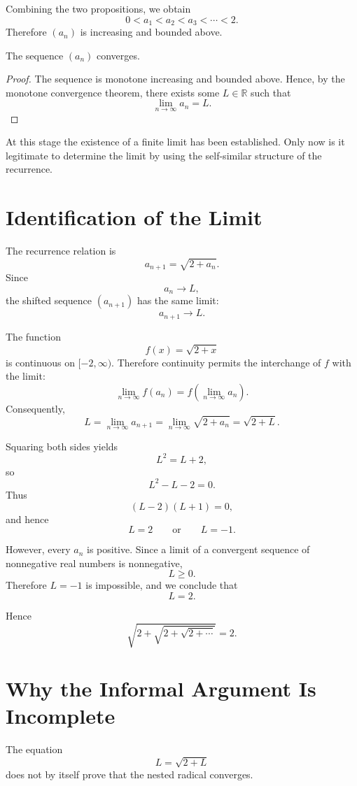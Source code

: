 \documentclass{essay}
\begin{document}
Combining the two propositions, we obtain
\[ 0<a_{1}<a_{2}<a_{3}<\cdots<2. \]
Therefore \((a_{n})\) is increasing and bounded above.

\begin{theorem}
  The sequence \((a_{n})\) converges.
\end{theorem}

\begin{proof}
  The sequence is monotone increasing and bounded above. Hence, by the monotone convergence theorem, there exists some \(L\in\mathbb{R}\) such that
  \[ \lim_{n\to\infty} a_{n}=L. \]
\end{proof}

At this stage the existence of a finite limit has been established. Only now is it legitimate to determine the limit by using the self-similar structure of the recurrence.

\section{Identification of the Limit}

The recurrence relation is
\[ a_{n+1}=\sqrt{2+a_{n}}. \]
Since
\[ a_{n}\to L, \]
the shifted sequence \((a_{n+1})\) has the same limit:
\[ a_{n+1}\to L. \]

The function
\[ f(x)=\sqrt{2+x} \]
is continuous on \([-2,\infty)\). Therefore continuity permits the interchange of \(f\) with the limit:
\[ \lim_{n\to\infty} f(a_{n}) = f\left(\lim_{n\to\infty} a_{n}\right). \]
Consequently,
\[ L = \lim_{n\to\infty} a_{n+1} = \lim_{n\to\infty}\sqrt{2+a_{n}} = \sqrt{2+L}. \]

Squaring both sides yields
\[ L^{2}=L+2, \]
so
\[ L^{2}-L-2=0. \]
Thus
\[ (L-2)(L+1)=0, \]
and hence
\[ L=2 \qquad\text{or}\qquad L=-1. \]

However, every \(a_{n}\) is positive. Since a limit of a convergent sequence of nonnegative real numbers is nonnegative,
\[ L\geq 0. \]
Therefore \(L=-1\) is impossible, and we conclude that
\[ \boxed{L=2}. \]

Hence
\[ \boxed{ \sqrt{2+\sqrt{2+\sqrt{2+\cdots}}}=2 }. \]

\section{Why the Informal Argument Is Incomplete}

The equation
\[ L=\sqrt{2+L} \]
does not by itself prove that the nested radical converges.
\end{document}
